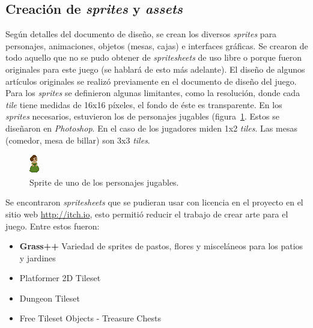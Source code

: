 \subsection{Creación de \textit{sprites} y \textit{assets}}
Según detalles del documento de diseño, se crean los diversos \textit{sprites} para personajes, animaciones, objetos (mesas, cajas) e interfaces gráficas. Se crearon de todo aquello que no se pudo obtener de \textit{spritesheets} de uso libre o porque fueron originales para este juego (se hablará de esto más adelante). El diseño de algunos artículos originales se realizó previamente en el documento de diseño del juego. Para los \textit{sprites} se definieron algunas limitantes, como la resolución, donde cada \textit{tile}  tiene medidas de 16x16 píxeles, el fondo de éste es transparente. En los \textit{sprites} necesarios, estuvieron los de personajes jugables (figura~\ref{fig:sprite_johanna}. Estos se diseñaron en \textit{Photoshop}. En el caso de los jugadores miden 1x2 \textit{tiles}. Las mesas (comedor, mesa de billar) son 3x3 \textit{tiles}.

\begin{figure}
    \centering
    \includegraphics[width=0.25\linewidth]{images/JohannaOrdonez.png}
    \caption{Sprite de uno de los personajes jugables.}
    \label{fig:sprite_johanna}
\end{figure}

Se encontraron \textit{spritesheets} que se pudieran usar con licencia en el proyecto en el sitio web \url{http://itch.io}, esto permitió reducir el trabajo de crear arte para el juego.
Entre estos fueron:
\begin{itemize}
    \item \textbf{Grass++} Variedad de sprites de pastos, flores y misceláneos para los patios y jardines
    \item Platformer 2D Tileset
    \item Dungeon Tileset
    \item Free Tileset Objects - Treasure Chests
\end{itemize}

